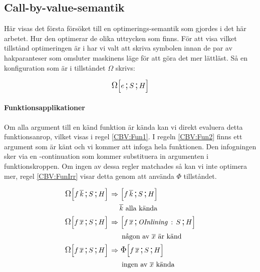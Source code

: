 \documentclass[../Optimise]{subfiles}
\begin{document}

\subsection{Call-by-value-semantik}
\label{sec:Optimise:CBV}

Här visas det första försöket till en optimerings-semantik som gjordes i det
här arbetet. Hur den optimerar de olika uttrycken som finns. 
För att visa vilket tillstånd optimeringen är i har vi valt att skriva symbolen
innan de par av hakparanteser som omsluter maskinens läge för att göra det mer
lättläst. Så en konfiguration som är i tillståndet $\Omega$ skrivs:

\[
\OMEGA SHe
\]




\paragraph{Funktionsapplikationer}
Om alla argument till en känd funktion är kända kan vi direkt evaluera detta funktionsanrop,
vilket visas i regel \eqref{CBV:Fun1}. I regeln \eqref{CBV:Fun2} finns ett argument som
är känt och vi kommer att infoga hela funktionen. Den infogningen sker via en -continuation
som kommer substituera in argumenten i funktionskroppen. Om ingen av dessa regler
matchades så kan vi inte optimera mer, regel \eqref{CBV:FunIrr} visar detta genom
att använda $\Phi$ tillståndet.

\begin{comment}
\begin{align}
\label{CBV:Fun1} \OMEGA SH{f\,\many{k}}  \rulesep &\, \mc{f\,\many{k}}SH\\
 & \many{k} \text{ alla kända} \nonumber \\
\label{CBV:Fun2} \OMEGA SH{f\,\many{x}\, k\,\many{y}}  \rulesep &\, \mc{f\,\many{x}\, k\,\many{y}}{\oInline S}H\\
 & \many{x},\many{y} \text{ okänd, } k \text{ är känd} \nonumber \\
\label{CBV:FunIrr} \OMEGA SH{f\,\many{x}} \rulesep &\, \IRR SH{f\,\many{x}}
\end{align}
\end{comment}

\begin{align}
\label{CBV:Fun1} \OMEGA SH{f\,\many{k}}  \rulesep &\, \mc{f\,\many{k}}SH\\
 & \many{k} \text{ alla kända} \nonumber \\
\label{CBV:Fun2} \OMEGA SH{f\,\many{x}}  \rulesep &\, \mc{f\,\many{x}}{\oInline S}H\\
 & \text{ någon av } \many{x} \text{ är känd} \nonumber \\
\label{CBV:FunIrr} \OMEGA SH{f\,\many{x}} \rulesep &\, \IRR SH{f\,\many{x}} \\
 & \text{ ingen av } \many{x} \text{ kända} \nonumber
\end{align}
\end{document}
